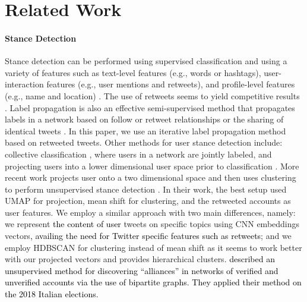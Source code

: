 \documentclass[letterpaper]{article} \usepackage{aaai20}  \usepackage{times}  \usepackage{stackengine}
\newcommand{\kareem}{\textcolor{black}}
\begin{document}
\section{Related Work}
\paragraph{Stance Detection} 
Stance detection can be performed using supervised classification and using a variety of features such as text-level features (e.g., words or hashtags), user-interaction features (e.g., user mentions and retweets), and profile-level features (e.g., name and location) \citep{borge2015content,magdy2016isisisnotislam,magdy2016failedrevolutions}. The use of retweets seems to yield competitive results \citep{magdy2016isisisnotislam,wong2013quantifying,wong2016quantifying}. 
Label propagation is also an effective semi-supervised method that propagates labels in a network based on follow or retweet relationships \citep{borge2015content,weber2013secular} or the sharing of identical tweets \citep{darwish2018scotus,kutlu2018devam,magdy2016isisisnotislam}. In this paper, we use an iterative label propagation method based on retweeted tweets. Other methods for user stance detection include: collective classification \citep{duan2012graph}, where users in a network are jointly labeled, and projecting users into a lower dimensional user space prior to classification \citep{darwish2017improved}.  More recent work projects user onto a two dimensional space and then uses clustering to perform unsupervised stance detection \citep{darwish2019unsupervisedStance}.  In their work, the best setup used UMAP for projection, mean shift for clustering, and the retweeted accounts as user features.  We employ a similar approach with two main differences, namely: we represent \kareem{the content of user} tweets on specific topics using CNN embeddings vectors\kareem{, availing the need for Twitter specific features such as retweets}; and we employ HDBSCAN for clustering instead of mean shift as it seems to work better with our projected vectors and provides hierarchical clusters.  \kareem{\cite{becatti2019extracting} described an unsupervised method for discovering ``alliances'' in  networks of verified and unverified accounts via the use of bipartite graphs.  They applied their method on the 2018 Italian elections.}
\end{document}
